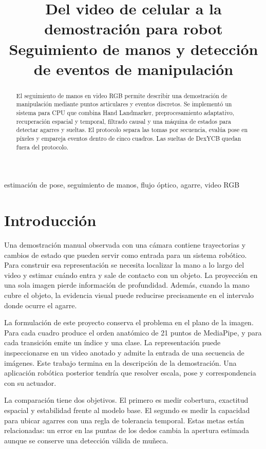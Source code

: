 \documentclass[conference]{IEEEtran}
\title{Del video de celular a la demostración para robot\\
Seguimiento de manos y detección de eventos de manipulación}
\author{
\IEEEauthorblockN{}
\IEEEauthorblockA{Proyecto final de Visión Artificial}
}
\begin{document}
\maketitle
\begin{abstract}
El seguimiento de manos en video RGB permite describir una demostración de manipulación mediante puntos articulares y eventos discretos. Se implementó un sistema para CPU que combina Hand Landmarker, preprocesamiento adaptativo, recuperación espacial y temporal, filtrado causal y una máquina de estados para detectar agarres y sueltas. El protocolo separa las tomas por secuencia, evalúa pose en píxeles y empareja eventos dentro de cinco cuadros.  Las sueltas de DexYCB quedan fuera del protocolo. 
\end{abstract}
\begin{IEEEkeywords}
estimación de pose, seguimiento de manos, flujo óptico, agarre, video RGB
\end{IEEEkeywords}

\section{Introducción}
Una demostración manual observada con una cámara contiene trayectorias y cambios de estado que pueden servir como entrada para un sistema robótico. Para construir esa representación se necesita localizar la mano a lo largo del video y estimar cuándo entra y sale de contacto con un objeto. La proyección en una sola imagen pierde información de profundidad. Además, cuando la mano cubre el objeto, la evidencia visual puede reducirse precisamente en el intervalo donde ocurre el agarre.

La formulación de este proyecto conserva el problema en el plano de la imagen. Para cada cuadro produce el orden anatómico de 21 puntos de MediaPipe, y para cada transición emite un índice y una clase. La representación puede inspeccionarse en un video anotado y admite la entrada de una secuencia de imágenes. Este trabajo termina en la descripción de la demostración. Una aplicación robótica posterior tendría que resolver escala, pose y correspondencia con su actuador.

La comparación tiene dos objetivos. El primero es medir cobertura, exactitud espacial y estabilidad frente al modelo base. El segundo es medir la capacidad para ubicar agarres con una regla de tolerancia temporal. Estas metas están relacionadas: un error en las puntas de los dedos cambia la apertura estimada aunque se conserve una detección válida de muñeca.
\end{document}
